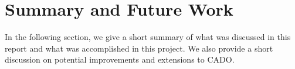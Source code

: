 \chapter{Summary and Future Work}
In the following section, we give a short summary of what was discussed in this report and what was accomplished in this project. We also provide a short discussion on potential improvements and extensions to CADO.




